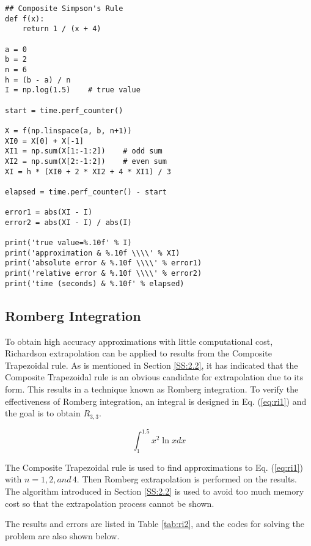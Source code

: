 \documentclass[preprint,12pt]{elsarticle}
\begin{document}
\begin{lstlisting}
## Composite Simpson's Rule
def f(x):
    return 1 / (x + 4)

a = 0
b = 2
n = 6
h = (b - a) / n
I = np.log(1.5)    # true value

start = time.perf_counter()

X = f(np.linspace(a, b, n+1))
XI0 = X[0] + X[-1]
XI1 = np.sum(X[1:-1:2])    # odd sum
XI2 = np.sum(X[2:-1:2])    # even sum
XI = h * (XI0 + 2 * XI2 + 4 * XI1) / 3

elapsed = time.perf_counter() - start

error1 = abs(XI - I)
error2 = abs(XI - I) / abs(I)

print('true value=%.10f' % I)
print('approximation & %.10f \\\\' % XI)
print('absolute error & %.10f \\\\' % error1)
print('relative error & %.10f \\\\' % error2)
print('time (seconds) & %.10f' % elapsed)
\end{lstlisting}

\subsection{Romberg Integration}
\label{SS:3.2}

To obtain high accuracy approximations with little computational cost, Richardson extrapolation can be applied to results from the Composite Trapezoidal rule. As is mentioned in Section \ref{SS:2.2}, it has indicated that the Composite Trapezoidal rule is an obvious candidate for extrapolation due to its form. This results in a technique known as Romberg integration. To verify the effectiveness of Romberg integration, an integral is designed in Eq. (\ref{eq:ri1}) and the goal is to obtain $R_{3,3}$.

\begin{equation}
\label{eq:ri1}
    \int_{1}^{1.5}{x^{2}\ln x dx}
\end{equation}

The Composite Trapezoidal rule is used to find approximations to Eq. (\ref{eq:ri1}) with $n=1,2,and\,4$. Then Romberg extrapolation is performed on the results. The algorithm introduced in Section \ref{SS:2.2} is used to avoid too much memory cost so that the extrapolation process cannot be shown.

The results and errors are listed in Table \ref{tab:ri2}, and the codes for solving the problem are also shown below.
\end{document}
